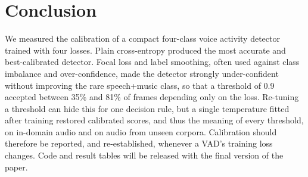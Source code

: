 \documentclass[conference]{IEEEtran}
\begin{document}
\section{Conclusion}
We measured the calibration of a compact four-class voice activity detector trained with four losses. Plain cross-entropy produced the most accurate and best-calibrated detector. Focal loss and label smoothing, often used against class imbalance and over-confidence, made the detector strongly under-confident without improving the rare speech+music class, so that a threshold of 0.9 accepted between 35\% and 81\% of frames depending only on the loss. Re-tuning a threshold can hide this for one decision rule, but a single temperature fitted after training restored calibrated scores, and thus the meaning of every threshold, on in-domain audio and on audio from unseen corpora. Calibration should therefore be reported, and re-established, whenever a VAD's training loss changes. Code and result tables will be released with the final version of the paper.



\end{document}

